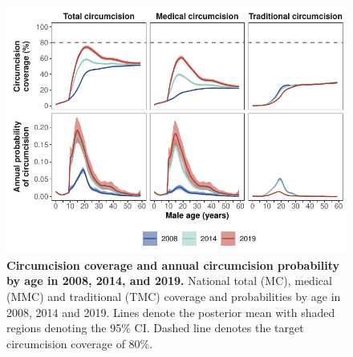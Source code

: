 \documentclass{article}
\begin{document}

\begin{figure}[H]
  \centering
  \includegraphics[width = 5.2in]{Figures/paper/Figure4.pdf}
  \caption{{\bf Circumcision coverage and annual circumcision probability by age in 2008, 2014, and 2019.}
    National total (MC), medical (MMC) and traditional (TMC) coverage and probabilities by age in 2008, 2014 and 2019. Lines denote the posterior mean with shaded regions denoting the 95\% CI. Dashed line denotes the target circumcision coverage of 80\%.}
  \label{fig::singleageprev}
\end{figure}

\end{document}
